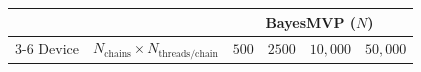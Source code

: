 \begin{table}[H]
{\begin{tabular}{llrrrr}
\toprule
 & & \multicolumn{4}{c}{BayesMVP ($N$)} \\
\cmidrule(lr){3-6}
Device & $N_{\text{chains}} \times N_{\text{threads/chain}}$ & $500$ & $2500$ & $10,000$ & $50,000$ \\
\midrule

\end{tabular}}
\end{table}
